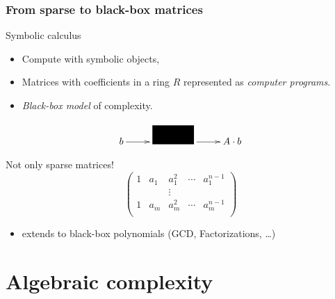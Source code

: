 \documentclass[10pt]{beamer}
\begin{document}

\begin{frame}
  \frametitle{From sparse to black-box matrices}

  \begin{block}{Symbolic calculus}
    \begin{itemize}
    \item Compute with \alert{symbolic} objects,
    \item Matrices with coefficients in a ring $R$ represented as
      \emph{computer programs}.
    \item \emph{Black-box model} of complexity.
    \end{itemize}
  \end{block}

  \[\xymatrix{
    b\ar[r]  & \rule{10ex}{2em} \ar[r] & A\cdot b
  }\]

  \begin{block}{Not only sparse matrices!}
    \[\begin{pmatrix}
      1 & a_1 & a_1^2 & \cdots & a_1^{n-1}\\
      &&\vdots \\
      1 & a_m & a_m^2 & \cdots & a_m^{n-1}\\
    \end{pmatrix}\]
    \begin{itemize}
    \item \cite{KaTr90} extends to black-box polynomials (GCD,
      Factorizations, \dots)
    \end{itemize}
  \end{block}
\end{frame}


\section{Algebraic complexity}
\end{document}
